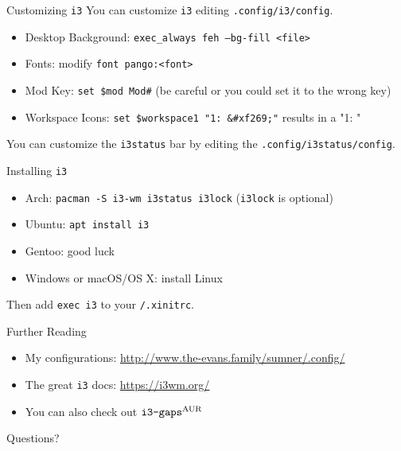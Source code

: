\documentclass{lug}
\newcommand{\textapprox}{\raisebox{0.5ex}{\texttildelow}}
\newcommand{\ithree}{\texttt{i3}\xspace}
\begin{document}
\begin{frame}{Customizing \ithree}
    You can customize \ithree editing \texttt{.config/i3/config}.
    \begin{itemize}
        \item Desktop Background: \texttt{exec\_always feh --bg-fill <file>}
        \item Fonts: modify \texttt{font pango:<font>}
        \item Mod Key: \texttt{set \$mod Mod\#} (be careful or you could set it
            to the wrong key)
        \item Workspace Icons: \texttt{set \$workspace1 "1: \&\#xf269;"} results
            in a "1: \faFirefox"
    \end{itemize}

    You can customize the \texttt{i3status} bar by editing the
    \texttt{.config/i3status/config}.
\end{frame}

\begin{frame}{Installing \ithree}
    \begin{itemize}
        \item Arch: \texttt{pacman -S i3-wm i3status i3lock} (\texttt{i3lock} is
            optional)
        \item Ubuntu: \texttt{apt install i3}
        \item Gentoo: good luck
        \item Windows or macOS/OS X: install Linux
    \end{itemize}

    Then add \texttt{exec i3} to your \texttt{\textapprox/.xinitrc}.
\end{frame}

\begin{frame}{Further Reading}
    \begin{itemize}
        \item My configurations: \url{http://www.the-evans.family/sumner/.config/}
        \item The great \ithree docs: \url{https://i3wm.org/}
        \item You can also check out $\text{\texttt{i3-gaps}}^{\text{AUR}}$
    \end{itemize}
\end{frame}

\begin{frame}[standout]
    \Huge
    Questions?
\end{frame}
\end{document}
